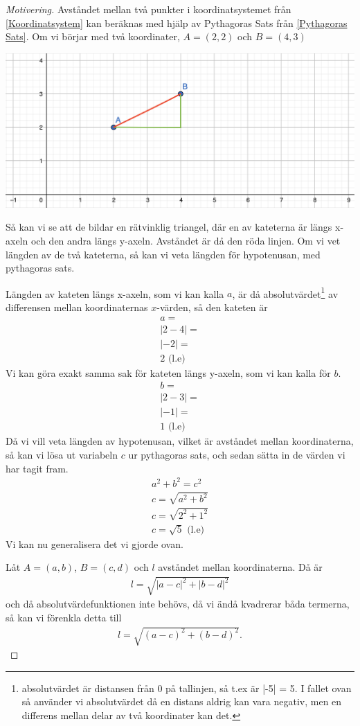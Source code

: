 \begin{proof}[Motivering]
Avståndet mellan två punkter i koordinatsystemet från \ref{Koordinatsystem} kan beräknas med hjälp av Pythagoras Sats från \ref{Pythagoras Sats}. Om vi börjar med två koordinater, $A=(2,2)$ och $B=(4,3)$

\includegraphics[width=\textwidth]{img/3.png}

Så kan vi se att de bildar en rätvinklig triangel, där en av kateterna är längs x-axeln och den andra längs y-axeln. Avståndet är då den röda linjen. Om vi vet längden av de två kateterna, så kan vi veta längden för hypotenusan, med pythagoras sats.

Längden av kateten längs x-axeln, som vi kan kalla $a$, är då absolutvärdet\footnote{absolutvärdet är distansen från $0$ på tallinjen, så t.ex är |-5| = 5. I fallet ovan så använder vi absolutvärdet då en distans aldrig kan vara negativ, men en differens mellan delar av två koordinater kan det.} av differensen mellan koordinaternas $x$-värden, så den kateten är
\begin{align*}
	a = \\
	|2-4| = \\
	|-2| = \\
	2 \text{ (l.e)}
\end{align*}
Vi kan göra exakt samma sak för kateten längs y-axeln, som vi kan kalla för $b$.
\begin{align*}
	b = \\
	|2-3| = \\
	|-1| = \\
	1 \text{ (l.e)}
\end{align*}
Då vi vill veta längden av hypotenusan, vilket är avståndet mellan koordinaterna, så kan vi lösa ut variabeln $c$ ur pythagoras sats, och sedan sätta in de värden vi har tagit fram.
\begin{align*}
	a^2+b^2=c^2 \\
	c = \sqrt{a^2+b^2} \\
	c = \sqrt{2^2+1^2} \\
	c = \sqrt{5} \text{ (l.e)}
\end{align*}
Vi kan nu generalisera det vi gjorde ovan. 

Låt $A=(a,b)$, $B=(c,d)$ och $l$  avståndet mellan koordinaterna. Då är
\begin{align*}
	l = \sqrt{|a-c|^2+|b-d|^2}
\end{align*}
och då absolutvärdefunktionen inte behövs, då vi ändå kvadrerar båda termerna, så kan vi förenkla detta till
\begin{align}
	l = \sqrt{(a-c)^2+(b-d)^2}.
\end{align}
\end{proof}

